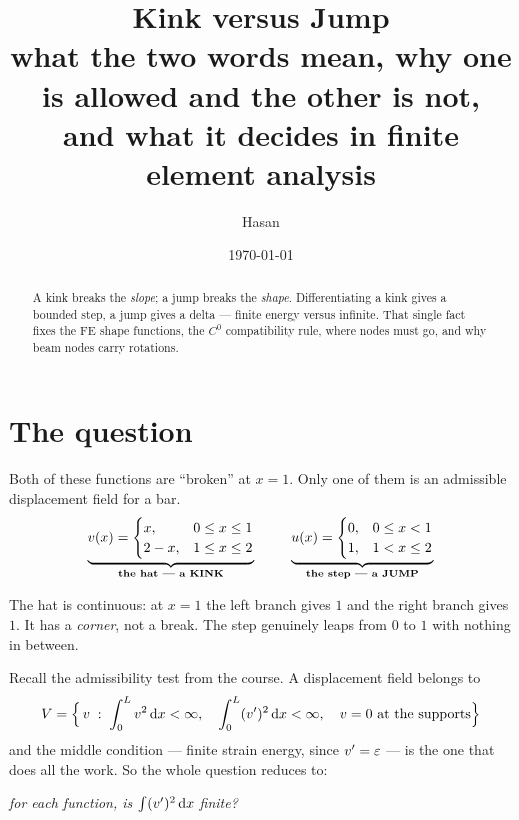 \documentclass[11pt]{article}
\title{\bfseries Kink versus Jump\\[0.35em]
  \large what the two words mean, why one is allowed and the other is not,\\
  and what it decides in finite element analysis}
\author{Hasan}
\date{\today}
\begin{document}
\maketitle
\thispagestyle{fancy}

\begin{abstract}\noindent
A kink breaks the \emph{slope}; a jump breaks the \emph{shape}. Differentiating
a kink gives a bounded step, a jump gives a delta --- finite energy versus
infinite. That single fact fixes the FE shape functions, the $C^{0}$
compatibility rule, where nodes must go, and why beam nodes carry rotations.
\end{abstract}

\vspace{-0.5em}
\section{The question}

Both of these functions are ``broken'' at $x=1$. Only one of them is an
admissible displacement field for a bar.
\begin{equation}\label{eq:two}
  \underbrace{v(x)=\begin{cases} x, & 0\le x\le 1\\ 2-x, & 1\le x\le 2\end{cases}}_{\textbf{the hat --- a KINK}}
  \hspace{2.5em}
  \underbrace{u(x)=\begin{cases} 0, & 0\le x< 1\\ 1, & 1< x\le 2\end{cases}}_{\textbf{the step --- a JUMP}}
\end{equation}

The hat is continuous: at $x=1$ the left branch gives $1$ and the right branch
gives $1$. It has a \emph{corner}, not a break. The step genuinely leaps from
$0$ to $1$ with nothing in between.

Recall the admissibility test from the course. A displacement field belongs to
\[
  V=\Bigl\{\,v \;:\; \int_{0}^{L} v^{2}\,\mathrm{d} x<\infty,\quad
  \int_{0}^{L} (v')^{2}\,\mathrm{d} x<\infty,\quad v=0 \text{ at the supports}\Bigr\}
\]
and the middle condition --- finite strain energy, since $v'=\varepsilon$ --- is the
one that does all the work. So the whole question reduces to:
\begin{center}
\emph{for each function, is $\int (v')^{2}\,\mathrm{d} x$ finite?}
\end{center}
\end{document}
